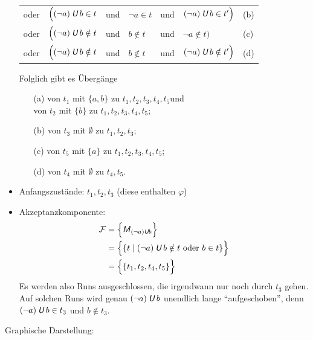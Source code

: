 \documentclass[fontsize=11pt, twoside=false, numbers=autoenddot]{scrbook}
\begin{document}
\begin{itemize}
\begin{center}
\begin{tabular}{@{}l@{~~}l@{~~}l@{~~}l@{~~}l@{~~}l@{\qquad}l@{}}
        oder & $\Big((\lnot a)\mathbin{\textit{\textsf{U}}} b\in t$    & und & $\lnot a\in t$ & und & $(\lnot a)\mathbin{\textit{\textsf{U}}} b \in t'\Big)$   & (b) \\
        oder & $\Big((\lnot a)\mathbin{\textit{\textsf{U}}} b\notin t$ & und & $b \notin t$   & und & $\lnot a \notin t\Big)$       & (c) \\
        oder & $\Big((\lnot a)\mathbin{\textit{\textsf{U}}} b\notin t$ & und & $b \notin t$   & und & $(\lnot a)\mathbin{\textit{\textsf{U}}} b\notin t'\Big)$ & (d)
      \end{tabular}
    \end{center}
    Folglich gibt es Übergänge
    \begin{itemize}
      \item[(a)]
        von $t_1$ mit $\{a,b\}$ zu $t_1,t_2,t_3,t_4,t_5$\quad und \\
        von $t_2$ mit $\{b\}$ zu $t_1,t_2,t_3,t_4,t_5$;
      \item[(b)]
        von $t_3$ mit $\emptyset$ zu $t_1,t_2,t_3$;
      \item[(c)]
        von $t_5$ mit $\{a\}$ zu $t_1,t_2,t_3,t_4,t_5$;
      \item[(d)]
        von $t_4$ mit $\emptyset$ zu $t_4,t_5$.
    \end{itemize}
  \item
    Anfangszustände: $t_1,t_2,t_3$ (diese enthalten $\varphi$)
  \item
    Akzeptanzkomponente:
    \begin{align*}
      \mathcal{F} & = \Big\{\textsf{\textit{M}}_{(\lnot a)\mathbin{\textit{\textsf{U}}} b}\Big\} \\
           & = \Big\{ \{t \mid (\lnot a)\mathbin{\textit{\textsf{U}}} b \notin t \text{~oder~} b \in t \} \Big\} \\
           & = \Big\{\{t_1,t_2,t_4,t_5\}\Big\}
    \end{align*}
    \enlargethispage*{20mm}%
    Es werden also Runs ausgeschlossen, die irgendwann nur noch durch $t_3$ gehen.
    Auf solchen Runs wird genau $(\lnot a)\mathbin{\textit{\textsf{U}}} b$ unendlich lange "`aufgeschoben"',
    denn $(\lnot a)\mathbin{\textit{\textsf{U}}} b \in t_3$ und $b \notin t_3$.
\end{itemize}
%
Graphische Darstellung:
%
\goodbreak
\end{document}
